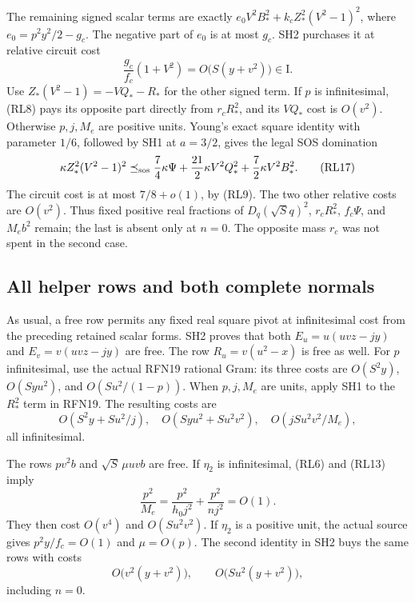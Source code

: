 The remaining signed scalar terms are exactly
\(e_0V^2B_*^2+k_cZ_*^2(V^2-1)^2\), where
\(e_0=p^2y^2/2-g_c\).
The negative part of \(e_0\) is at most \(g_c\).
SH2 purchases it at relative circuit cost
\[
 \frac{g_c}{f_c}(1+V^2)
   =O\bigl(S(y+v^2)\bigr)\in\mathrm I.                \tag{RL16}
\]
Use \(Z_*(V^2-1)=-VQ_*-R_*\) for the other signed term.
If \(p\) is infinitesimal, (RL8) pays its opposite part
directly from \(r_cR_*^2\), and its \(VQ_*\) cost is
\(O(v^2)\).
Otherwise \(p,j,M_e\) are positive units.  Young's exact
square identity with parameter \(1/6\), followed by SH1 at
\(a=3/2\), gives the legal SOS domination
\[
 \kappa Z_*^2(V^2-1)^2
 \preceq_{\rm sos}
 \frac74\kappa\Psi+
 \frac{21}{2}\kappa V^2Q_*^2+
 \frac72\kappa V^2B_*^2 .                             \tag{RL17}
\]
The circuit cost is at most \(7/8+o(1)\), by (RL9).
The two other relative costs are \(O(v^2)\).
Thus fixed positive real fractions of \(D_q(\sqrt S q)^2\),
\(r_cR_*^2\), \(f_c\Psi\), and \(M_eb^2\) remain;
the last is absent only at \(n=0\).
The opposite mass \(r_c\) was not spent in the second case.

\subsection{All helper rows and both complete normals}

As usual, a free row permits any fixed real square pivot at
infinitesimal cost from the preceding retained scalar forms.
SH2 proves that both \(E_u=u(uvz-jy)\) and \(E_v=v(uvz-jy)\)
are free.  The row \(R_u=v(u^2-x)\) is free as well.
For \(p\) infinitesimal, use the actual RFN19 rational Gram:
its three costs are \(O(S^2y)\), \(O(Syu^2)\),
and \(O(Su^2/(1-p))\).
When \(p,j,M_e\) are units, apply SH1 to the \(R_*^2\)
term in RFN19.  The resulting costs are
\[
 O(S^2y+Su^2/j),\quad O(Syu^2+Su^2v^2),\quad
 O(jSu^2v^2/M_e),                                    \tag{RL18}
\]
all infinitesimal.

The rows \(pv^2b\) and \(\sqrt S\,\mu uvb\) are free.
If \(\eta_2\) is infinitesimal, (RL6) and (RL13) imply
\[
 \frac{p^2}{M_e}
  =\frac{p^2}{h_0j^2}+\frac{p^2}{nj^2}=O(1).
                                                               \tag{RL19}
\]
They then cost \(O(v^4)\) and \(O(Su^2v^2)\).
If \(\eta_2\) is a positive unit, the actual source gives
\(p^2y/f_c=O(1)\) and \(\mu=O(p)\).
The second identity in SH2 buys the same rows with costs
\[
 O\bigl(v^2(y+v^2)\bigr),\qquad
 O\bigl(Su^2(y+v^2)\bigr),                             \tag{RL20}
\]
including \(n=0\).

